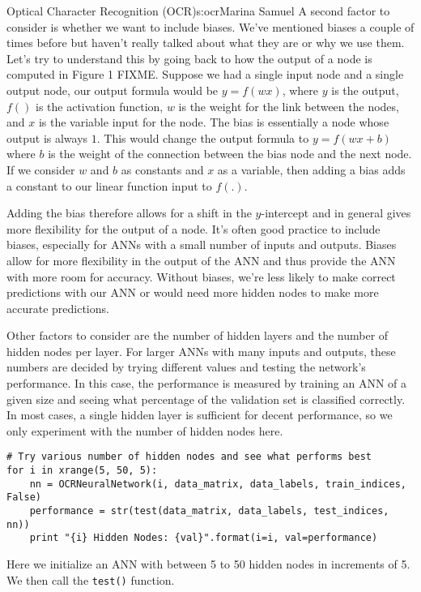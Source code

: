 \begin{aosachapter}{Optical Character Recognition (OCR)}{s:ocr}{Marina Samuel}
A second factor to consider is whether we want to include biases. We've
mentioned biases a couple of times before but haven't really talked
about what they are or why we use them. Let's try to understand this by
going back to how the output of a node is computed in Figure 1 FIXME.
Suppose we had a single input node and a single output node, our output
formula would be $y = f(wx)$, where $y$ is the output, $f()$ is the
activation function, $w$ is the weight for the link between the nodes,
and $x$ is the variable input for the node. The bias is essentially a
node whose output is always $1$. This would change the output formula to
$y = f(wx + b)$ where $b$ is the weight of the connection between the
bias node and the next node. If we consider $w$ and $b$ as constants and
$x$ as a variable, then adding a bias adds a constant to our linear
function input to $f(.)$.

Adding the bias therefore allows for a shift in the $y$-intercept and in
general gives more flexibility for the output of a node. It's often good
practice to include biases, especially for ANNs with a small number of
inputs and outputs. Biases allow for more flexibility in the output of
the ANN and thus provide the ANN with more room for accuracy. Without
biases, we're less likely to make correct predictions with our ANN or
would need more hidden nodes to make more accurate predictions.

Other factors to consider are the number of hidden layers and the number
of hidden nodes per layer. For larger ANNs with many inputs and outputs,
these numbers are decided by trying different values and testing the
network's performance. In this case, the performance is measured by
training an ANN of a given size and seeing what percentage of the
validation set is classified correctly. In most cases, a single hidden
layer is sufficient for decent performance, so we only experiment with
the number of hidden nodes here.

\begin{verbatim}
# Try various number of hidden nodes and see what performs best
for i in xrange(5, 50, 5):
    nn = OCRNeuralNetwork(i, data_matrix, data_labels, train_indices, False)
    performance = str(test(data_matrix, data_labels, test_indices, nn))
    print "{i} Hidden Nodes: {val}".format(i=i, val=performance)
\end{verbatim}

Here we initialize an ANN with between 5 to 50 hidden nodes in
increments of 5. We then call the \texttt{test()} function.


\end{aosachapter}
